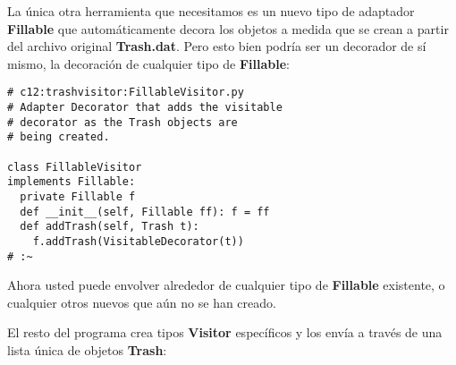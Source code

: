 La única otra herramienta que necesitamos es un nuevo tipo de adaptador \textbf{Fillable} que automáticamente decora los objetos a medida que se crean a partir del archivo original \textbf{Trash.dat}. Pero esto bien podría ser un decorador de sí mismo, la decoración de cualquier tipo de \textbf{Fillable}:        \newline

\begin{lstlisting} 
# c12:trashvisitor:FillableVisitor.py  
# Adapter Decorator that adds the visitable  
# decorator as the Trash objects are  
# being created. 

class FillableVisitor 
implements Fillable: 
  private Fillable f 
  def __init__(self, Fillable ff): f = ff  
  def addTrash(self, Trash t): 
    f.addTrash(VisitableDecorator(t)) 
# :~ 
\end{lstlisting}
Ahora usted puede envolver alrededor de cualquier tipo de \textbf{Fillable} existente,  o cualquier otros nuevos que aún no se han creado. \newline

El resto del programa crea tipos \textbf{Visitor} específicos y los envía a través de una lista única de objetos \textbf{Trash}:   \newline

